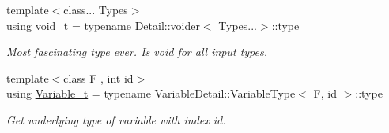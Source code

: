 \begin{DoxyCompactItemize}
{\footnotesize template$<$class... Types$>$ }\\using \hyperlink{namespaceFunG_a0cde667596590eb8d32e4a5ee76ddbb9}{void\-\_\-t} = typename Detail\-::voider$<$ Types...$>$\-::type
\begin{DoxyCompactList}\small\item\em Most fascinating type ever. Is void for all input types. \end{DoxyCompactList}\item 
{\footnotesize template$<$class F , int id$>$ }\\using \hyperlink{namespaceFunG_afc90c0241d79dc4e02ffe640816ec94f}{Variable\-\_\-t} = typename Variable\-Detail\-::\-Variable\-Type$<$ F, id $>$\-::type
\begin{DoxyCompactList}\small\item\em Get underlying type of variable with index id. \end{DoxyCompactList}\end{DoxyCompactItemize}
